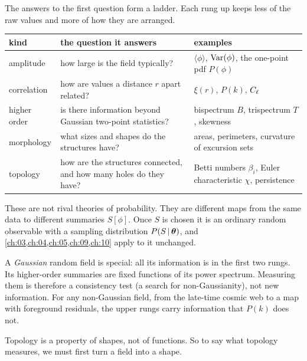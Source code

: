 The answers to the first question form a ladder. Each rung up keeps less of
the raw values and more of how they are arranged.

\begin{taxonomy}
\small
\renewcommand{\arraystretch}{1.3}
\begin{tabularx}{\linewidth}{@{}>{\raggedright\arraybackslash}p{2.3cm}
  >{\raggedright\arraybackslash}X >{\raggedright\arraybackslash}p{4.4cm}@{}}
\toprule
\textbf{kind} & \textbf{the question it answers} & \textbf{examples}\\
\midrule
amplitude & how large is the field typically? & $\langle\phi\rangle$, $\operatorname{Var}(\phi)$, the one-point pdf $P(\phi)$\\
correlation & how are values a distance $r$ apart related? & $\xi(r)$, $P(k)$, $C_\ell$\\
higher order & is there information beyond Gaussian two-point statistics? & bispectrum $B$, trispectrum $T$, skewness\\
morphology & what sizes and shapes do the structures have? & areas, perimeters, curvature of excursion sets\\
topology & how are the structures connected, and how many holes do they have? & Betti numbers $\beta_i$, Euler characteristic $\chi$, persistence\\
\bottomrule
\end{tabularx}
\smallskip
These are not rival theories of probability. They are different maps from
the same data to different summaries $S[\phi]$. Once $S$ is chosen it is an
ordinary random observable with a sampling distribution $P(S\,\vert\,\bm{\theta})$,
and \cref{ch:03,ch:04,ch:05,ch:09,ch:10} apply to it unchanged.
\end{taxonomy}

A \emph{Gaussian} random field is special: all its information is in the
first two rungs. Its higher-order summaries are fixed functions of its power
spectrum. Measuring them is therefore a consistency test (a search for
non-Gaussianity), not new information. For any non-Gaussian field, from the
late-time cosmic web to a map with foreground residuals, the upper rungs carry
information that $P(k)$ does not.

Topology is a property of shapes, not of functions. So to say what topology
measures, we must first turn a field into a shape.


